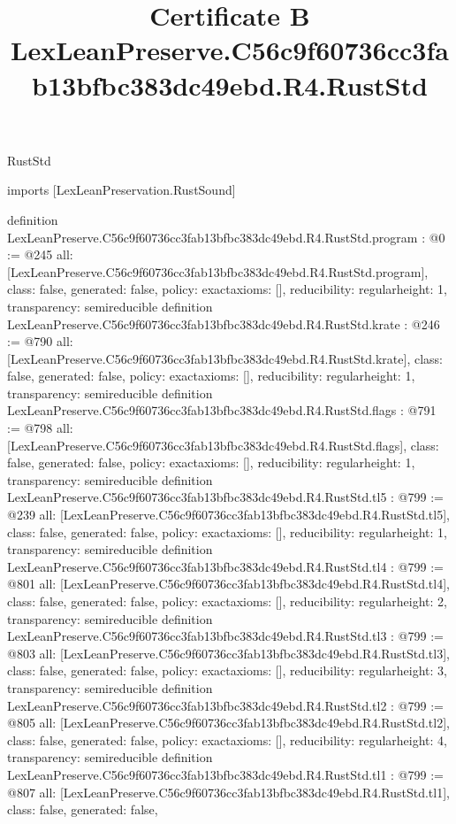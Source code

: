 \begin{lexlean}{RustStd}
\title{Certificate B LexLeanPreserve.C56c9f60736cc3fab13bfbc383dc49ebd.R4.RustStd}
\begin{coremodule}
imports [LexLeanPreservation.RustSound]

definition LexLeanPreserve.C56c9f60736cc3fab13bfbc383dc49ebd.R4.RustStd.program : @0 := @245 {
  all: [LexLeanPreserve.C56c9f60736cc3fab13bfbc383dc49ebd.R4.RustStd.program],
  class: false,
  generated: false,
  policy: exact{axioms: []},
  reducibility: regular{height: 1},
  transparency: semireducible
}
definition LexLeanPreserve.C56c9f60736cc3fab13bfbc383dc49ebd.R4.RustStd.krate : @246 := @790 {
  all: [LexLeanPreserve.C56c9f60736cc3fab13bfbc383dc49ebd.R4.RustStd.krate],
  class: false,
  generated: false,
  policy: exact{axioms: []},
  reducibility: regular{height: 1},
  transparency: semireducible
}
definition LexLeanPreserve.C56c9f60736cc3fab13bfbc383dc49ebd.R4.RustStd.flags : @791 := @798 {
  all: [LexLeanPreserve.C56c9f60736cc3fab13bfbc383dc49ebd.R4.RustStd.flags],
  class: false,
  generated: false,
  policy: exact{axioms: []},
  reducibility: regular{height: 1},
  transparency: semireducible
}
definition LexLeanPreserve.C56c9f60736cc3fab13bfbc383dc49ebd.R4.RustStd.tl5 : @799 := @239 {
  all: [LexLeanPreserve.C56c9f60736cc3fab13bfbc383dc49ebd.R4.RustStd.tl5],
  class: false,
  generated: false,
  policy: exact{axioms: []},
  reducibility: regular{height: 1},
  transparency: semireducible
}
definition LexLeanPreserve.C56c9f60736cc3fab13bfbc383dc49ebd.R4.RustStd.tl4 : @799 := @801 {
  all: [LexLeanPreserve.C56c9f60736cc3fab13bfbc383dc49ebd.R4.RustStd.tl4],
  class: false,
  generated: false,
  policy: exact{axioms: []},
  reducibility: regular{height: 2},
  transparency: semireducible
}
definition LexLeanPreserve.C56c9f60736cc3fab13bfbc383dc49ebd.R4.RustStd.tl3 : @799 := @803 {
  all: [LexLeanPreserve.C56c9f60736cc3fab13bfbc383dc49ebd.R4.RustStd.tl3],
  class: false,
  generated: false,
  policy: exact{axioms: []},
  reducibility: regular{height: 3},
  transparency: semireducible
}
definition LexLeanPreserve.C56c9f60736cc3fab13bfbc383dc49ebd.R4.RustStd.tl2 : @799 := @805 {
  all: [LexLeanPreserve.C56c9f60736cc3fab13bfbc383dc49ebd.R4.RustStd.tl2],
  class: false,
  generated: false,
  policy: exact{axioms: []},
  reducibility: regular{height: 4},
  transparency: semireducible
}
definition LexLeanPreserve.C56c9f60736cc3fab13bfbc383dc49ebd.R4.RustStd.tl1 : @799 := @807 {
  all: [LexLeanPreserve.C56c9f60736cc3fab13bfbc383dc49ebd.R4.RustStd.tl1],
  class: false,
  generated: false,
}
\end{coremodule}
\end{lexlean}
